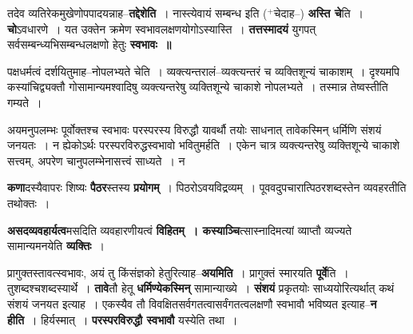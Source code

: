 \documentclass[article,12pt,a4paper]{memoir}
\newcommand{\add}[1]{($^{+}$#1)}
\begin{document}
	  \pstart तदेव व्यतिरेकमुखेणोपपादयन्ना\leavevmode{}ह--\textbf{तद्देशेति} । नास्त्येवायं सम्बन्ध इति \add{चेदाह--} \textbf{अस्ति चे}ति । \textbf{चो}ऽवधारणे । यत उक्तेन क्रमेण स्वभावलक्षणयोगोऽस्यास्ति । \textbf{तत्तस्मादयं} युगपत् सर्वसम्बन्ध्यभिसम्बन्धलक्षणो हेतुः \textbf{स्वभावः ॥}
	\pend
	  \bigskip
	  \begingroup
	

	  \pstart पक्षधर्मत्वं दर्शयितुमाह--नोपलभ्यते चेति । व्यक्त्यन्तरालं--व्यक्त्यन्तरं च व्यक्तिशून्यं चाकाशम् । दृश्यमपि कस्यांचिद्व्यक्तौ गोसामान्यमश्वादिषु व्यक्त्यन्तरेषु व्यक्तिशून्ये चाकाशे नोपलभ्यते । तस्मान्न तेष्वस्तीति गम्यते ।
	\pend
        

	  \pstart अयमनुपलम्भः पूर्वोक्तश्च स्वभावः परस्परस्य विरुद्धौ यावर्थौ तयोः साधनात् तावेकस्मिन् धर्मिणि संशयं जनयतः । न ह्येकोऽर्थः परस्परविरुद्धस्वभावो भवितुमर्हति । एकेन चात्र व्यक्त्यन्तरेषु व्यक्तिशून्ये चाकाशे सत्त्वम्, अपरेण चानुपलम्भेनासत्त्वं साध्यते । न
	\pend
      
	  \endgroup
	

	  \pstart \textbf{कणा}दस्यैवापरः शिष्यः \textbf{पैठर}स्तस्य \textbf{प्रयोगम्} । पिठरोऽवयविद्रव्यम् । पूववदुपचारात्पिठरशब्दस्तेन व्यवहरतीति तथोक्तः ।
	\pend
      

	  \pstart \textbf{असदव्यवहार्यत्व}मसदिति व्यवहारणीयत्वं \textbf{विहितम् । कस्याञ्चि}त्सास्नादिमत्यां व्याप्तौ  व्यज्यते सामान्यमनयेति \textbf{व्यक्तिः} ।
	\pend
      

	  \pstart प्रागुक्तस्तावत्स्वभावः, अयं तु किंसंज्ञको हेतुरित्याह--\textbf{अयमिति} । प्रागुक्तं स्मारयति \textbf{पूर्वे}ति । तुशब्दश्चशब्दस्यार्थे । \textbf{तावे}तौ हेतू \textbf{धर्मिण्येकस्मिन्} सामान्याख्ये । \textbf{संशयं} प्रकृतयोः साध्ययोरित्यर्थात् कथं संशयं जनयत इत्याह । एकस्यैव तौ विवक्षितसर्वगतत्वासर्वंगतत्वलक्षणौ स्वभावौ भविष्यत इत्याह--\textbf{न हीति} । हिर्यस्मात् । \textbf{परस्परविरुद्धौ स्वभावौ} यस्येति तथा ।
	\pend
      
\end{document}
